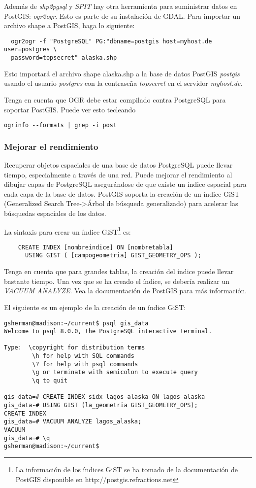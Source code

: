 Además de \textit{shp2pgsql} y \textit{SPIT} hay otra herramienta para suministrar datos en PostGIS: \textit{ogr2ogr}. Esto es parte de su instalación de GDAL. Para importar un archivo shape a PostGIS, haga lo siguiente:
\begin{verbatim}
  ogr2ogr -f "PostgreSQL" PG:"dbname=postgis host=myhost.de user=postgres \
  password=topsecret" alaska.shp
\end{verbatim}

Esto importará el archivo shape alaska.shp a la base de datos PostGIS \textit{postgis} usando el usuario \textit{postgres} con la contraseña \textit{topsecret} en el servidor
\textit{myhost.de}.

Tenga en cuenta que OGR debe estar compilado contra PostgreSQL para soportar PostGIS. Puede ver esto tecleando
\begin{verbatim}
ogrinfo --formats | grep -i post
\end{verbatim}

\subsubsection{Mejorar el rendimiento}\label{label_improve}

Recuperar objetos espaciales de una base de datos PostgreSQL puede llevar tiempo, especialmente a través de una red. Puede mejorar el rendimiento al dibujar capas de PostgreSQL asegurándose de que existe un índice espacial  para cada capa de la base de datos. PostGIS soporta la creación de un  índice GiST (Generalized Search Tree->Árbol de búsqueda generalizado) para acelerar las búsquedas espaciales de los datos.

La sintaxis para crear un índice GiST\footnote{La información de los índices GiST se ha tomado de la documentación de PostGIS disponible en http://postgis.refractions.net} es:

\begin{verbatim}
    CREATE INDEX [nombreindice] ON [nombretabla] 
      USING GIST ( [campogeometria] GIST_GEOMETRY_OPS );
\end{verbatim}

Tenga en cuenta que para grandes tablas, la creación del índice puede llevar bastante tiempo. Una vez que se ha creado el índice, se debería realizar un \textit{VACUUM ANALYZE}. Vea la documentación de PostGIS \cite{PostGISweb} para más información.

El siguiente es un ejemplo de la creación de un índice GiST:
\begin{verbatim}
gsherman@madison:~/current$ psql gis_data
Welcome to psql 8.0.0, the PostgreSQL interactive terminal.

Type:  \copyright for distribution terms
        \h for help with SQL commands
        \? for help with psql commands
        \g or terminate with semicolon to execute query
        \q to quit

gis_data=# CREATE INDEX sidx_lagos_alaska ON lagos_alaska
gis_data-# USING GIST (la_geometria GIST_GEOMETRY_OPS);
CREATE INDEX
gis_data=# VACUUM ANALYZE lagos_alaska;
VACUUM
gis_data=# \q
gsherman@madison:~/current$
\end{verbatim}


